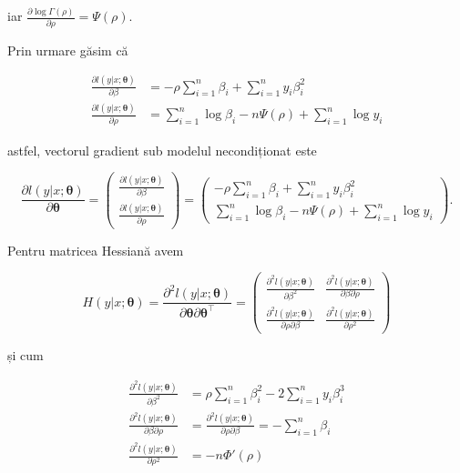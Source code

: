 \documentclass[]{article}
\begin{document}
iar \(\frac{\partial\log{\Gamma(\rho)}}{\partial \rho} = \Psi(\rho)\).

Prin urmare găsim că

\begin{align*}
  \frac{\partial l(y|x;\mathbf{\theta})}{\partial \beta} &= -\rho\sum_{i=1}^{n}\beta_i + \sum_{i=1}^{n}y_i\beta_i^2\\
  \frac{\partial l(y|x;\mathbf{\theta})}{\partial \rho} &= \sum_{i=1}^{n}\log{\beta_i} - n\Psi(\rho) + \sum_{i=1}^{n}\log{y_i}
\end{align*}

astfel, vectorul gradient sub modelul necondiționat este

\[
\frac{\partial l(y|x;\mathbf{\theta})}{\partial \mathbf{\theta}} = \begin{pmatrix}
  \frac{\partial l(y|x;\mathbf{\theta})}{\partial \beta}\\
  \frac{\partial l(y|x;\mathbf{\theta})}{\partial \rho}
\end{pmatrix} 
= 
\begin{pmatrix}
  -\rho\sum_{i=1}^{n}\beta_i + \sum_{i=1}^{n}y_i\beta_i^2\\
  \sum_{i=1}^{n}\log{\beta_i} - n\Psi(\rho) + \sum_{i=1}^{n}\log{y_i}
\end{pmatrix}.
\]

Pentru matricea Hessiană avem

\[
H(y|x;\mathbf{\theta}) = \frac{\partial^2 l(y|x;\mathbf{\theta})}{\partial \mathbf{\theta}\partial \mathbf{\theta}^\intercal} = \begin{pmatrix}
  \frac{\partial^2 l(y|x;\mathbf{\theta})}{\partial \beta^2} & \frac{\partial^2 l(y|x;\mathbf{\theta})}{\partial \beta\partial \rho}\\
  \frac{\partial^2 l(y|x;\mathbf{\theta})}{\partial \rho\partial \beta} & \frac{\partial^2 l(y|x;\mathbf{\theta})}{\partial \rho^2}
\end{pmatrix}
\]

și cum

\begin{align*}
  \frac{\partial^2 l(y|x;\mathbf{\theta})}{\partial \beta^2} &= \rho\sum_{i=1}^{n}\beta_i^2 - 2\sum_{i=1}^{n}y_i\beta_i^3\\
  \frac{\partial^2 l(y|x;\mathbf{\theta})}{\partial \beta\partial \rho} &= \frac{\partial^2 l(y|x;\mathbf{\theta})}{\partial \rho\partial \beta} = - \sum_{i=1}^{n}\beta_i\\
  \frac{\partial^2 l(y|x;\mathbf{\theta})}{\partial \rho^2} &= -n\Phi'(\rho)
\end{align*}
\end{document}
